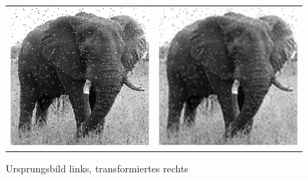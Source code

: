 \documentclass{mywork}
\begin{document}
\begin{aufgabe}
\begin{enumerate}[a)]
		\begin{figure}[h]
			\centering
			\caption{Ursprungsbild links, transformiertes rechts}
			\begin{tabular}{cc}
				\includegraphics[scale=0.3]{num1_4_4/num1_4_4_1.png}&
				\includegraphics[scale=0.3]{num1_4_4/num1_4_4_2.png}
			\end{tabular}
		\end{figure}
	\end{enumerate}
\end{aufgabe}
\end{document}
